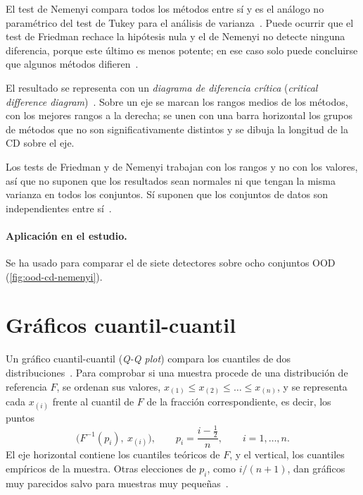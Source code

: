 El test de Nemenyi compara todos los métodos entre sí y es el análogo no paramétrico del test de Tukey para el análisis de varianza~\cite[sec.~3.2.2]{demsar2006}. Puede ocurrir que el test de Friedman rechace la hipótesis nula y el de Nemenyi no detecte ninguna diferencia, porque este último es menos potente; en ese caso solo puede concluirse que algunos métodos difieren~\cite[sec.~3.2.2]{demsar2006}.

El resultado se representa con un \emph{diagrama de diferencia crítica} (\emph{critical difference diagram})~\cite[sec.~3.2.4]{demsar2006}. Sobre un eje se marcan los rangos medios de los métodos, con los mejores rangos a la derecha; se unen con una barra horizontal los grupos de métodos que no son significativamente distintos y se dibuja la longitud de la CD sobre el eje.

Los tests de Friedman y de Nemenyi trabajan con los rangos y no con los valores, así que no suponen que los resultados sean normales ni que tengan la misma varianza en todos los conjuntos. Sí suponen que los conjuntos de datos son independientes entre sí~\cite[sec.~3]{demsar2006}.

\paragraph{Aplicación en el estudio.} Se ha usado para comparar el \AUROC de siete detectores sobre ocho conjuntos OOD (\cref{fig:ood-cd-nemenyi}).

\section{Gráficos cuantil-cuantil}\label{sec:qq-plot}


Un gráfico cuantil-cuantil (\emph{Q-Q plot}) compara los cuantiles de dos distribuciones~\cite[sec.~4.1]{wilk1968}. Para comprobar si una muestra procede de una distribución de referencia $F$, se ordenan sus valores, $x_{(1)} \le x_{(2)} \le \dots \le x_{(n)}$, y se representa cada $x_{(i)}$ frente al cuantil de $F$ de la fracción correspondiente, es decir, los puntos
\[
  \bigl(F^{-1}(p_i),\ x_{(i)}\bigr), \qquad p_i = \frac{i - \tfrac12}{n}, \qquad i = 1, \dots, n.
\]
El eje horizontal contiene los cuantiles teóricos de $F$, y el vertical, los cuantiles empíricos de la muestra. Otras elecciones de $p_i$, como $i/(n + 1)$, dan gráficos muy parecidos salvo para muestras muy pequeñas~\cite[sec.~5]{wilk1968}.

